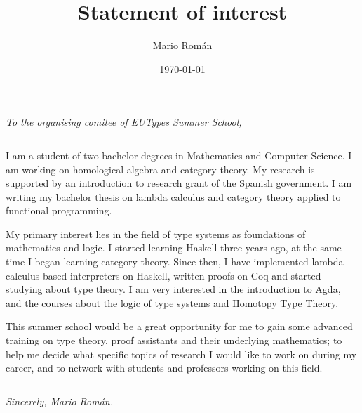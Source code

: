 \documentclass[11pt]{article}
\author{Mario Román}
\date{\today}
\title{Statement of interest}
\begin{document}
\maketitle
\emph{To the organising comitee of EUTypes Summer School,}

\(\quad\)

I am a student of two bachelor degrees in Mathematics and Computer
Science. I am working on homological algebra and category theory. My
research is supported by an introduction to research grant of the
Spanish government. I am writing my bachelor thesis on lambda calculus
and category theory applied to functional programming.

My primary interest lies in the field of type systems as foundations
of mathematics and logic. I started learning Haskell three years
ago, at the same time I began learning category theory. Since
then, I have implemented lambda calculus-based interpreters on
Haskell, written  proofs on Coq and started studying about type
theory. I am very interested in the introduction to Agda, and the
courses about the logic of type systems and Homotopy Type Theory.

This summer school would be a great opportunity for me to gain some
advanced training on type theory, proof assistants and their
underlying mathematics; to help me decide what specific topics of
research I would like to work on during my career, and to network with students
and professors working on this field.

\(\quad\)

\emph{Sincerely, Mario Román.}
\end{document}
